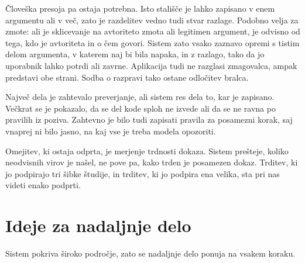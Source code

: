 \documentclass[a4paper, 12pt]{book}
\begin{document}
Človeška presoja pa ostaja potrebna. Isto stališče je lahko zapisano v enem
argumentu ali v več, zato je razdelitev vedno tudi stvar razlage. Podobno velja
za zmote: ali je sklicevanje na avtoriteto zmota ali legitimen argument, je
odvisno od tega, kdo je avtoriteta in o čem govori. Sistem zato vsako zaznavo
opremi s tistim delom argumenta, v katerem naj bi bila napaka, in z razlago,
tako da jo uporabnik lahko potrdi ali zavrne. Aplikacija tudi ne razglasi
zmagovalca, ampak predstavi obe strani. Sodba o razpravi tako ostane odločitev
bralca.

Največ dela je zahtevalo preverjanje, ali sistem res dela to, kar je zapisano.
Večkrat se je pokazalo, da se del kode sploh ne izvede ali da se ne ravna po
pravilih iz poziva. Zahtevno je bilo tudi zapisati pravila za posamezni korak,
saj vnaprej ni bilo jasno, na kaj vse je treba modela opozoriti.

Omejitev, ki ostaja odprta, je merjenje trdnosti dokaza. Sistem prešteje, koliko
neodvisnih virov je našel, ne pove pa, kako trden je posamezen dokaz. Trditev,
ki jo podpirajo tri šibke študije, in trditev, ki jo podpira ena velika, sta pri
nas videti enako podprti.

\section*{Ideje za nadaljnje delo}
\label{sec:nadaljnje-delo}

Sistem pokriva široko področje, zato se nadaljnje delo ponuja na vsakem koraku.
\end{document}
